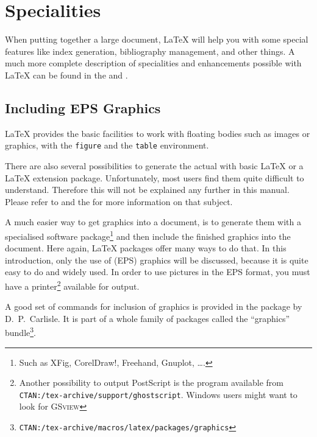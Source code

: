  
\chapter{Specialities}
\begin{intro}
  When putting together a large document, \LaTeX{} will help you
  with some special features like index generation,
  bibliography management, and other things.
  A much more complete description of specialities and
  enhancements possible with \LaTeX{} can be found in the
  {\normalfont\manual{}} and {\normalfont \companion}.
\end{intro}

\section{Including EPS Graphics}
\LaTeX{} provides the basic facilities to work with floating bodies
such as images or graphics, with the \texttt{figure} and the
\texttt{table} environment.

There are also several possibilities to generate the actual
 with basic \LaTeX{} or a \LaTeX{} extension package.
Unfortunately, most users find them quite difficult to understand.
Therefore this will not be explained any further in this manual.
Please refer to \companion{} and the \manual{} for more information on
that subject.

A much easier way to get graphics into a document, is to generate them
with a specialised software package\footnote{Such as XFig, CorelDraw!,
  Freehand, Gnuplot, \ldots.} and then include the finished graphics
into the document. Here again, \LaTeX{} packages offer many ways to do
that. In this introduction, only the use of  (EPS) graphics will be discussed, because it is quite
easy to do and widely used.  In order to use pictures in the EPS
format, you must have a  printer\footnote{Another
  possibility to output PostScript is the \textsc{}
  program available from
  \texttt{CTAN:/tex-archive/support/ghostscript}. Windows users might
  want to look for \textsc{GSview}} available for output.

A good set of commands for inclusion of graphics is provided in the
 package by D.~P.~Carlisle. It is part of a whole family
of packages called the ``graphics''
bundle\footnote{\texttt{CTAN:/tex-archive/macros/latex/packages/graphics}}.

